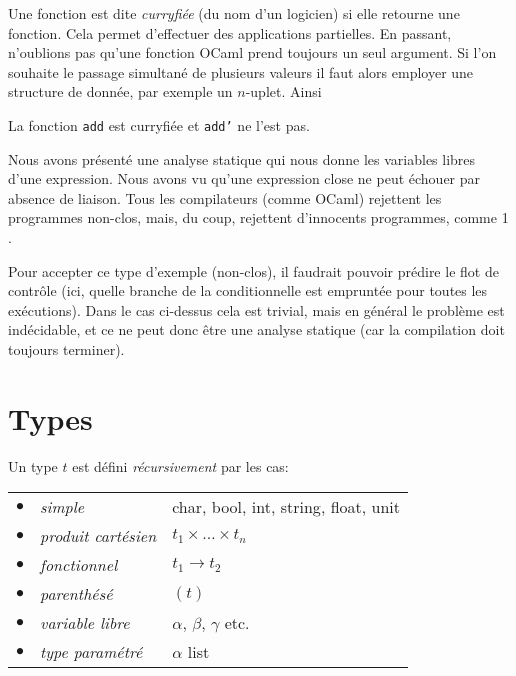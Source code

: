 
Une fonction est dite \emph{curryfiée} (du nom d'un logicien) si elle
retourne une fonction. Cela permet d'effectuer des applications
partielles. En passant, n'oublions pas qu'une fonction OCaml prend
toujours un seul argument. Si l'on souhaite le passage simultané de
plusieurs valeurs il faut alors employer une structure de donnée, par
exemple un $n$-uplet. Ainsi





\bigskip

La fonction \texttt{\small add} est curryfiée et \texttt{\small add'}
ne l'est pas.

Nous avons présenté une analyse statique qui nous donne les variables
libres d'une expression. Nous avons vu qu'une expression close ne peut
échouer par absence de liaison. Tous les compilateurs (comme OCaml)
rejettent les programmes non-clos, mais, du coup, rejettent
d'innocents programmes, comme \Xif{} \Xtrue{} \Xthen{} \num{1}
\Xelse{} .

Pour accepter ce type d'exemple (non-clos), il faudrait pouvoir
prédire le flot de contrôle (ici, quelle branche de la conditionnelle
est empruntée pour toutes les exécutions). Dans le cas ci-dessus cela
est trivial, mais en général le problème est indécidable, et ce ne
peut donc être une analyse statique (car la compilation doit toujours
terminer).

\section{Types}

Un type $t$ est défini \emph{récursivement} par les cas:

\begin{tabular}{rll}
    $\bullet$
  & \emph{simple}
  & \textsf{char}, \textsf{bool}, \textsf{int}, \textsf{string},
    \textsf{float}, \textsf{unit}\\
    $\bullet$
  & \emph{produit cartésien}
  & $t_1 \times \ldots \times t_n$\\
    $\bullet$
  & \emph{fonctionnel}
  & $t_1 \rightarrow t_2$\\
    $\bullet$
  & \emph{parenthésé}
  & $(t)$\\
    $\bullet$
  & \emph{variable libre}
  & $\alpha$, $\beta$, $\gamma$ etc. \\
    $\bullet$
  & \emph{type paramétré}
  & $\alpha$ \textsf{list}
\end{tabular}

